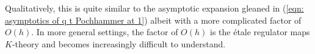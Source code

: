 Qualitatively, this is quite similar to the asymptotic expansion gleaned in (\ref{eqn: asymptotics of q t Pochhammer at 1}) albeit with a more complicated factor of $O(h)$. In more general settings, the factor of $O(h)$ is the \'{e}tale regulator maps $K$-theory and becomes increasingly difficult to understand. 
